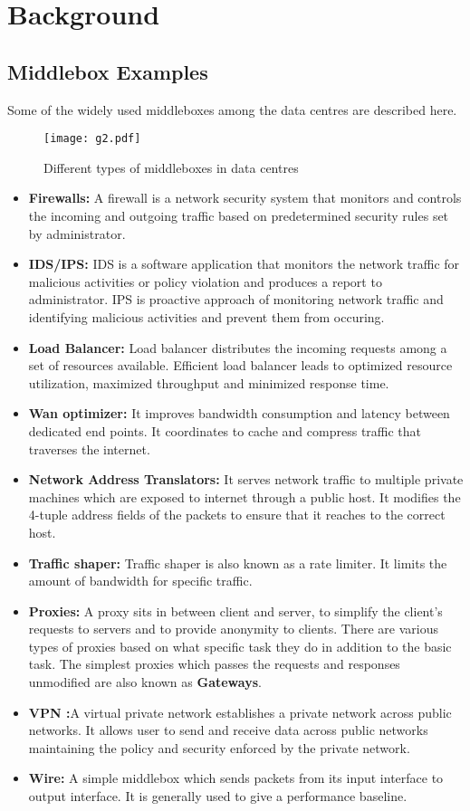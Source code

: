 \documentclass[a4paper,11pt]{report}
\begin{document}
\chapter{Background}
\section{Middlebox Examples}
Some of the widely used middleboxes among the data centres are described here.
\begin{figure}[h]
\centering
\texttt{[image: g2.pdf]}
\caption{Different types of middleboxes in data centres~\cite{DM}}
\end{figure} 

\begin{itemize}
\item \textbf{Firewalls: }A firewall is a network security system that monitors and controls the incoming and outgoing traffic based on predetermined security rules set by administrator.~\cite{FW}
\item \textbf{IDS/IPS: }IDS is a software application that monitors the network traffic for malicious activities or policy violation and produces a report to administrator. IPS is proactive approach of monitoring network traffic and identifying malicious activities and prevent them from occuring.~\cite{IDS}
\item \textbf{Load Balancer: }Load balancer distributes the incoming requests among a set of resources available. Efficient load balancer leads to optimized resource utilization, maximized throughput and minimized response time.
\item \textbf{Wan optimizer: }It improves bandwidth consumption and latency between dedicated end points. It coordinates to cache and compress traffic that traverses the internet.~\cite{MB}
\item \textbf{Network Address Translators: }It serves network traffic to multiple private machines which are exposed to internet through a public host. It modifies the 4-tuple address fields of the packets to ensure that it reaches to the correct host.
\item \textbf{Traffic shaper: }Traffic shaper is also known as a rate limiter. It limits the amount of bandwidth for specific traffic.
\item \textbf{Proxies: }A proxy sits in between client and server, to simplify the client's requests to servers and to provide anonymity to clients. There are various types of proxies based on what specific task they do in addition to the basic task. The simplest proxies which passes the requests and responses unmodified are also known as \textbf{Gateways}.
\item \textbf{VPN :}A virtual private network establishes a private network across public networks. It allows user to send and receive data across public networks maintaining the policy and security enforced by the private network.  
\item \textbf{Wire: }A simple middlebox which sends packets from its input interface to output interface. It is generally used to give a performance baseline.            
\end{itemize}
\end{document}
